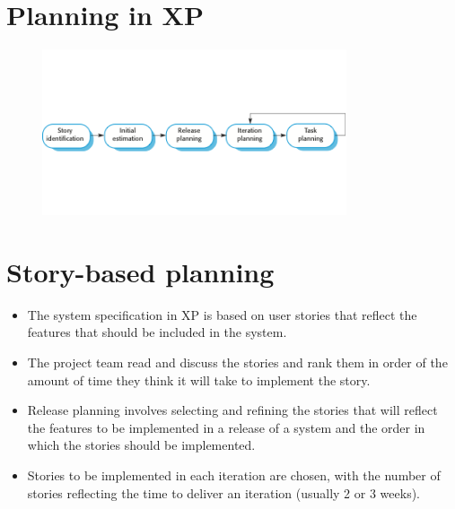 \section{Planning in XP}
\begin{figure}[h!]
    \centering
    \includegraphics[width = 0.8\textwidth]{./figures/L6_5.png}
    \caption{}
    \label{fig:L6_5}
\end{figure}

\section{Story-based planning}
\begin{itemize}

\item The system specification in XP is based on user stories that reflect the features that should be included in the system.

\item The project team read and discuss the stories and rank them in order of the amount of time they think it will take to implement the story.

\item Release planning involves selecting and refining the stories that will reflect the features to be implemented in a release of a system and the order in which the stories should be implemented.

\item Stories to be implemented in each iteration are chosen, with the number of stories reflecting the time to deliver an iteration (usually 2 or 3 weeks).
\end{itemize}
